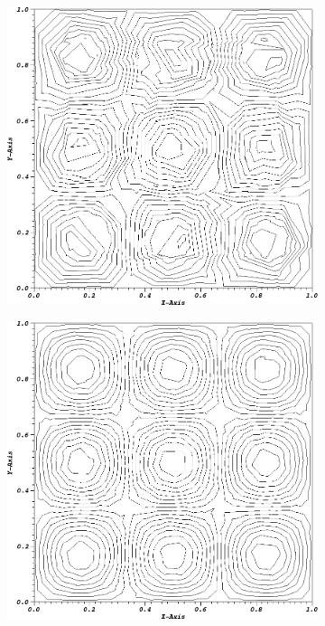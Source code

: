 \begin{figure}
{\begin{subfigure}[b]{0.45\textwidth}
	\end{subfigure}
}
\vspace{2.5mm}
{
	\begin{subfigure}[b]{0.45\textwidth}
		\centering
		\label{subfig::SineMMS_SqPolyn64_PWL2}
		\includegraphics[width=\textwidth]{figures/sec_BF/MMSSine_PWLD2_SQPMesh_n64.png}
	\end{subfigure}
	\hfill
	\begin{subfigure}[b]{0.45\textwidth}
		\centering
		\label{subfig::SineMMS_SqPolyn256_PWL2}
		\includegraphics[width=\textwidth]{figures/sec_BF/MMSSine_PWLD2_SQPMesh_n256.png}

\end{subfigure}}
\end{figure}
